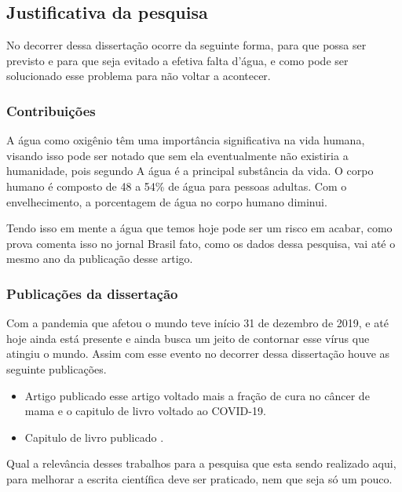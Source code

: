 \subsection{Justificativa da pesquisa} \label{subsec:justif}

No decorrer dessa dissertação ocorre da seguinte forma, para que possa ser previsto e para que seja evitado a efetiva falta d'água, e como pode ser solucionado esse problema para não voltar a acontecer.

\subsubsection{Contribuições} \label{subsubsec:Contribuição}

A água como oxigênio têm uma importância significativa na vida humana, visando isso pode ser notado que sem ela eventualmente não existiria a humanidade, pois segundo  A água é a principal substância da vida. O corpo humano é composto de 48 a 54\% de água para pessoas adultas. Com o envelhecimento, a porcentagem de água no corpo humano diminui.

Tendo isso em mente a água que temos hoje pode ser um risco em acabar, como prova  comenta isso no jornal Brasil fato, como os dados dessa pesquisa, vai até o mesmo ano da publicação desse artigo.

\subsubsection{Publicações da dissertação}\label{subsubsec:publicação}

Com a pandemia que afetou o mundo teve início 31 de dezembro de 2019, e até hoje ainda está presente e ainda busca um jeito de contornar esse vírus que atingiu o mundo. Assim com esse evento no decorrer dessa dissertação houve as seguinte publicações.

\begin{itemize}
	\item Artigo publicado  esse artigo voltado mais a fração de cura no câncer de mama e o capitulo de livro voltado ao COVID-19.
	\item Capitulo de livro publicado .
\end{itemize}

Qual a relevância desses trabalhos para a pesquisa que esta sendo realizado aqui, para melhorar a escrita científica deve ser praticado, nem que seja só um pouco. 